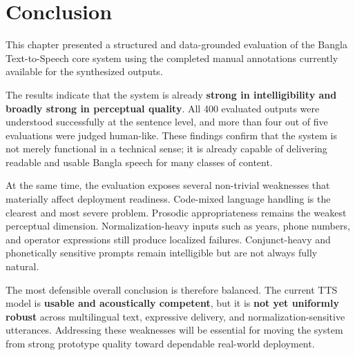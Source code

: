 \section{Conclusion}

This chapter presented a structured and data-grounded evaluation of the Bangla Text-to-Speech core system using the completed manual annotations currently available for the synthesized outputs.

The results indicate that the system is already \textbf{strong in intelligibility and broadly strong in perceptual quality}. All 400 evaluated outputs were understood successfully at the sentence level, and more than four out of five evaluations were judged human-like. These findings confirm that the system is not merely functional in a technical sense; it is already capable of delivering readable and usable Bangla speech for many classes of content.

At the same time, the evaluation exposes several non-trivial weaknesses that materially affect deployment readiness. Code-mixed language handling is the clearest and most severe problem. Prosodic appropriateness remains the weakest perceptual dimension. Normalization-heavy inputs such as years, phone numbers, and operator expressions still produce localized failures. Conjunct-heavy and phonetically sensitive prompts remain intelligible but are not always fully natural.

The most defensible overall conclusion is therefore balanced. The current TTS model is \textbf{usable and acoustically competent}, but it is \textbf{not yet uniformly robust} across multilingual text, expressive delivery, and normalization-sensitive utterances. Addressing these weaknesses will be essential for moving the system from strong prototype quality toward dependable real-world deployment.
